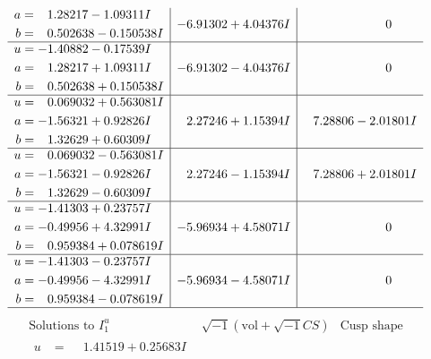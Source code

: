 \documentclass[1p]{elsarticle_modified}
\theoremstyle{definition}
\newcommand{\I}{\sqrt{-1}}
\begin{document}
$$\begin{array}{c|c|c}
\begin{aligned}
a &= \phantom{-}1.28217 - 1.09311 I \\
b &= \phantom{-}0.502638 - 0.150538 I\end{aligned}
 & -6.91302 + 4.04376 I & \phantom{-0.000000 } 0 \\ \hline\begin{aligned}
u &= -1.40882 - 0.17539 I \\
a &= \phantom{-}1.28217 + 1.09311 I \\
b &= \phantom{-}0.502638 + 0.150538 I\end{aligned}
 & -6.91302 - 4.04376 I & \phantom{-0.000000 } 0 \\ \hline\begin{aligned}
u &= \phantom{-}0.069032 + 0.563081 I \\
a &= -1.56321 + 0.92826 I \\
b &= \phantom{-}1.32629 + 0.60309 I\end{aligned}
 & \phantom{-}2.27246 + 1.15394 I & \phantom{-}7.28806 - 2.01801 I \\ \hline\begin{aligned}
u &= \phantom{-}0.069032 - 0.563081 I \\
a &= -1.56321 - 0.92826 I \\
b &= \phantom{-}1.32629 - 0.60309 I\end{aligned}
 & \phantom{-}2.27246 - 1.15394 I & \phantom{-}7.28806 + 2.01801 I \\ \hline\begin{aligned}
u &= -1.41303 + 0.23757 I \\
a &= -0.49956 + 4.32991 I \\
b &= \phantom{-}0.959384 + 0.078619 I\end{aligned}
 & -5.96934 + 4.58071 I & \phantom{-0.000000 } 0 \\ \hline\begin{aligned}
u &= -1.41303 - 0.23757 I \\
a &= -0.49956 - 4.32991 I \\
b &= \phantom{-}0.959384 - 0.078619 I\end{aligned}
 & -5.96934 - 4.58071 I & \phantom{-0.000000 } 0\\
 \hline 
 \end{array}$$\newpage$$\begin{array}{c|c|c}  
\text{Solutions to }I^u_{1}& \I (\text{vol} + \sqrt{-1}CS) & \text{Cusp shape}\\
 \hline 
\begin{aligned}
u &= \phantom{-}1.41519 + 0.25683 I \\

\end{aligned}
\end{array}$$
\end{document}
